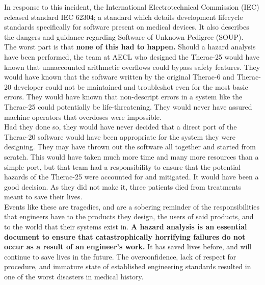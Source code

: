 \documentclass{article}
\begin{document}
In response to this incident, the International Electrotechnical Commission (IEC) released standard IEC 62304; a standard which details development lifecycle standards specifically for software present on medical devices. It also describes the dangers and guidance regarding Software of Unknown Pedigree (SOUP).\\

The worst part is that \textbf{none of this had to happen.} Should a hazard analysis have been performed, the team at AECL who designed the Therac-25 would have known that unnaccounted arithmetic overflows could bypass safety features. They would have known that the software written by the original Therac-6 and Therac-20 developer could not be maintained and troubleshot even for the most basic errors. They would have known that non-descript errors in a system like the Therac-25 could potentially be life-threatening. They would never have assured machine operators that overdoses were impossible. \\

Had they done so, they would have never decided that a direct port of the Therac-20 software would have been appropriate for the system they were designing. They may have thrown out the software all together and started from scratch. This would have taken much more time and many more resources than a simple port, but that team had a responsibility to ensure that the potential hazards of the Therac-25 were accounted for and mitigated. It would have been a good decision. As they did not make it, three patients died from treatments meant to save their lives.\cite{rose_1994}\\

Events like these are tragedies, and are a sobering reminder of the responsibilities that engineers have to the products they design, the users of said products, and to the world that their systems exist in. \textbf{A hazard analysis is an essential document to ensure that catastrophically horrifying failures do not occur as a result of an engineer's work.} It has saved lives before, and will continue to save lives in the future. The overconfidence, lack of respect for procedure, and immature state of established engineering standards resulted in one of the worst disasters in medical history.\\
\end{document}
